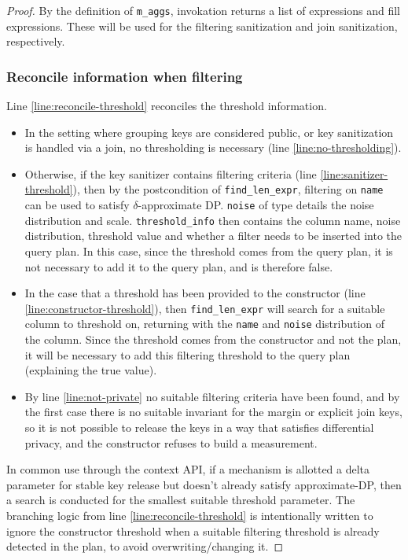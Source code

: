\documentclass{article}
\begin{document}
\begin{proof}
By the definition of \texttt{m\_aggs}, invokation returns a list of expressions and fill expressions.
These will be used for the filtering sanitization and join sanitization, respectively.

\subsubsection{Reconcile information when filtering}
Line \ref{line:reconcile-threshold} reconciles the threshold information.
\begin{itemize}
    \item In the setting where grouping keys are considered public,
    or key sanitization is handled via a join, no thresholding is necessary (line \ref{line:no-thresholding}).
    \item Otherwise, if the key sanitizer contains filtering criteria (line \ref{line:sanitizer-threshold}),
    then by the postcondition of \texttt{find\_len\_expr}, filtering on \texttt{name} can be used to satisfy
    $\delta$-approximate DP.
    \texttt{noise} of type  details the noise distribution and scale.
    \texttt{threshold\_info} then contains the column name, noise distribution, threshold value and whether a filter needs to be inserted into the query plan.
    In this case, since the threshold comes from the query plan, it is not necessary to add it to the query plan, and is therefore false.
    \item In the case that a threshold has been provided to the constructor (line \ref{line:constructor-threshold}),
    then \texttt{find\_len\_expr} will search for a suitable column to threshold on,
    returning with the \texttt{name} and \texttt{noise} distribution of the column.
    Since the threshold comes from the constructor and not the plan, it will be necessary to add this filtering threshold to the query plan (explaining the true value).
    \item By line \ref{line:not-private} no suitable filtering criteria have been found,
    and by the first case there is no suitable invariant for the margin or explicit join keys,
    so it is not possible to release the keys in a way that satisfies differential privacy,
    and the constructor refuses to build a measurement.
\end{itemize}

In common use through the context API, if a mechanism is allotted a delta parameter for stable key release but doesn't already satisfy approximate-DP,
then a search is conducted for the smallest suitable threshold parameter.
The branching logic from line \ref{line:reconcile-threshold} is intentionally written to ignore the constructor threshold
when a suitable filtering threshold is already detected in the plan, to avoid overwriting/changing it.


\end{proof}
\end{document}
